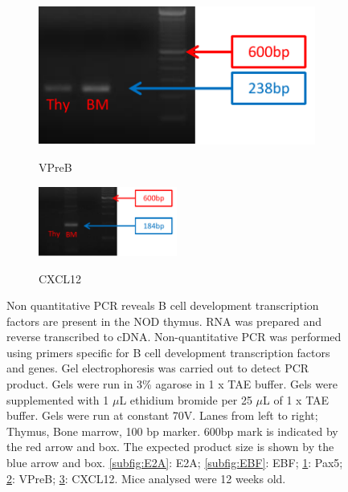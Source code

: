 \begin{figure}
\begin{subfigure}{0.5\textwidth}
	\label{subfig:Pax5}
	\end{subfigure}
	\begin{subfigure}{0.5\textwidth}
	\centering
	\caption{VPreB}
	\includegraphics[width=\textwidth]{Figures/VPreB.pdf}
	\label{subfig:VPreB}
	\end{subfigure}
	\begin{subfigure}{\textwidth}
	\caption{CXCL12}
	\includegraphics[width=0.5\textwidth]{Figures/CXCL12.pdf}
	\label{subfig:CXCL12}
	\end{subfigure}
\caption[Non quantitative PCR reveals B cell development transcription factors are present in the NOD thymus]{Non quantitative PCR reveals B cell development transcription factors are present in the NOD thymus.
RNA was prepared and reverse transcribed to cDNA.
Non-quantitative PCR was performed using primers specific for B cell development transcription factors and genes.
Gel electrophoresis was carried out to detect PCR product.
Gels were run in 3\% agarose in 1 x TAE buffer. Gels were supplemented with 1 $\mu$L ethidium bromide per 25 $\mu$L of 1 x TAE buffer. Gels were run at constant 70V.
Lanes from left to right; Thymus, Bone marrow, 100 bp marker. 
600bp mark is indicated by the red arrow and box.
The expected product size is shown by the blue arrow and box.
\ref{subfig:E2A}: E2A; \ref{subfig:EBF}: EBF; \ref{subfig:Pax5}: Pax5; \ref{subfig:VPreB}: VPreB; \ref{subfig:CXCL12}: CXCL12.
Mice analysed were 12 weeks old.}
\label{fig:gels}
\end{figure}


